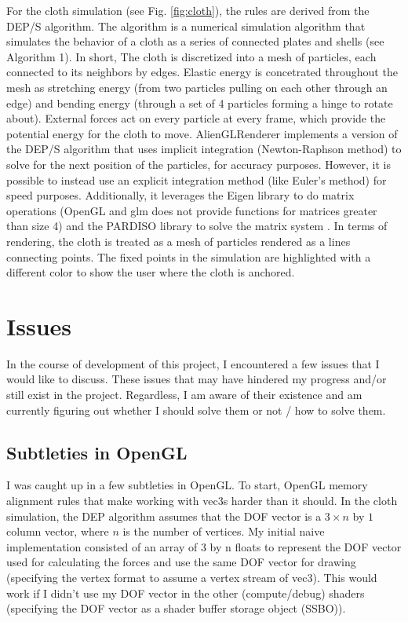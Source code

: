 \documentclass[letterpaper, 10 pt, conference]{ieeeconf}  %
\begin{document}
For the cloth simulation (see Fig. \ref{fig:cloth}), the rules are derived from the DEP/S algorithm. The algorithm is a numerical simulation algorithm that simulates the behavior of a cloth as a series of connected plates and shells (see Algorithm 1). In short, The cloth is discretized into a mesh of particles, each connected to its neighbors by edges. Elastic energy is concetrated throughout the mesh as stretching energy (from two particles pulling on each other through an edge) and bending energy (through a set of 4 particles forming a hinge to rotate about). External forces act on every particle at every frame, which provide the potential energy for the cloth to move. AlienGLRenderer implements a version of the DEP/S algorithm that uses implicit integration (Newton-Raphson method) to solve for the next position of the particles, for accuracy purposes. However, it is possible to instead use an explicit integration method (like Euler's method) for speed purposes. Additionally, it leverages the Eigen library \cite{eigen_library} to do matrix operations (OpenGL and glm does not provide functions for matrices greater than size 4) and the PARDISO library to solve the matrix system \cite{Pasadakis2023} \cite{EFTEKHARI2021101389} \cite{gaedkemerzhäuser2022}. In terms of rendering, the cloth is treated as a mesh of particles rendered as a lines connecting points. The fixed points in the simulation are highlighted with a different color to show the user where the cloth is anchored.

\section {Issues}
In the course of development of this project, I encountered a few issues that I would like to discuss. These issues that may have hindered my progress and/or still exist in the project. Regardless, I am aware of their existence and am currently figuring out whether I should solve them or not / how to solve them.

\subsection{Subtleties in OpenGL}
I was caught up in a few subtleties in OpenGL. To start, OpenGL memory alignment rules that make working with vec3s harder than it should. In the cloth simulation, the DEP algorithm assumes that the DOF vector is a $ 3 \times n $ by $ 1 $ column vector, where $n$ is the number of vertices. My initial naive implementation consisted of an array of 3 by n floats to represent the DOF vector used for calculating the forces and use the same DOF vector for drawing (specifying the vertex format to assume a vertex stream of vec3). This would work if I didn't use my DOF vector in the other (compute/debug) shaders (specifying the DOF vector as a shader buffer storage object (SSBO)).
\end{document}
